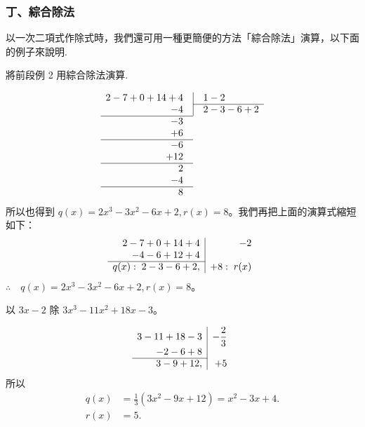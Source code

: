 \subsubsection*{丁、綜合除法}\label{subsec:5-4-d}

以一次二項式作除式時，我們還可用一種更簡便的方法「綜合除法」演算，以下面的例子來說明.

\begin{example}\label{ex:5-4-7}
將前段例 2 用綜合除法演算.
\end{example}

\begin{solution*}
\begin{equation*}
\begin{array}{r@{\quad}l}
  2 - 7 + 0 + 14 + 4 & \vline\quad 1 - 2 \\ \cline{2-2}
  - 4 & \vline\quad 2 - 3 - 6 + 2 \\ \cline{1-1}
  - 3 & \\
  + 6 & \\ \cline{1-1}
  - 6 & \\
  + 12 & \\ \cline{1-1}
  2 & \\
  - 4 & \\ \cline{1-1}
  8 &
\end{array}
\end{equation*}
所以也得到 $q(x)=2x^3-3x^2-6x+2, r(x)=8$。我們再把上面的演算式縮短如下：
\begin{equation*}
\begin{array}{r|r}
  2 - 7 + 0 + 14 + 4 & -2 \\
  - 4 - 6 + 12 + 4 & \\ \cline{1-1}
  q(x): \; 2 - 3 - 6 + 2, & +8: \; r(x)
\end{array}
\end{equation*}
$\therefore \quad q(x)=2x^3-3x^2-6x+2, r(x)=8$。
\end{solution*}

\begin{example}\label{ex:5-4-8}
以 $3x-2$ 除 $3x^3-11x^2+18x-3$。
\end{example}

\begin{solution*}
\begin{equation*}
\begin{array}{r|r}
  3 - 11 + 18 - 3 & -\dfrac{2}{3} \\
  - 2 - 6 + 8 & \\ \cline{1-1}
  3 - 9 + 12, & +5
\end{array}
\end{equation*}
所以
\begin{align*}
  q(x) &= \frac{1}{3}(3x^2-9x+12) = x^2-3x+4. \\
  r(x) &= 5.
\end{align*}
\end{solution*}

